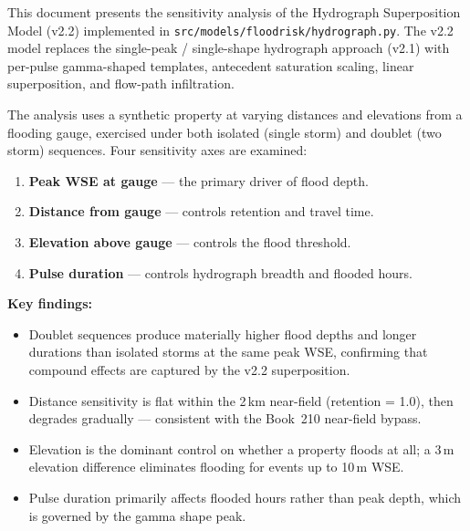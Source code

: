 \documentclass[11pt,a4paper]{article}
\begin{document}
\mkmtitlepage
\mkmlegalpage
\tableofcontents
\clearpage

\mkmexecsummary

This document presents the sensitivity analysis of the Hydrograph Superposition
Model (v2.2) implemented in \texttt{src/models/floodrisk/hydrograph.py}.  The
v2.2 model replaces the single-peak / single-shape hydrograph approach (v2.1)
with per-pulse gamma-shaped templates, antecedent saturation scaling, linear
superposition, and flow-path infiltration.

The analysis uses a synthetic property at varying distances and elevations from a
flooding gauge, exercised under both isolated (single storm) and doublet (two
storm) sequences.  Four sensitivity axes are examined:

\begin{enumerate}[nosep]
    \item \textbf{Peak WSE at gauge} --- the primary driver of flood depth.
    \item \textbf{Distance from gauge} --- controls retention and travel time.
    \item \textbf{Elevation above gauge} --- controls the flood threshold.
    \item \textbf{Pulse duration} --- controls hydrograph breadth and flooded hours.
\end{enumerate}

\noindent\textbf{Key findings:}
\begin{itemize}[nosep]
    \item Doublet sequences produce materially higher flood depths and longer
          durations than isolated storms at the same peak WSE, confirming that
          compound effects are captured by the v2.2 superposition.
    \item Distance sensitivity is flat within the 2\,km near-field (retention = 1.0),
          then degrades gradually --- consistent with the Book~210 near-field bypass.
    \item Elevation is the dominant control on whether a property floods at all;
          a 3\,m elevation difference eliminates flooding for events up to 10\,m WSE.
    \item Pulse duration primarily affects flooded hours rather than peak depth,
          which is governed by the gamma shape peak.
\end{itemize}
\end{document}
